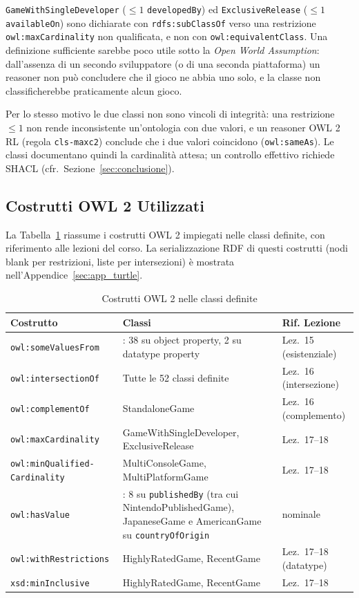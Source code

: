 \texttt{GameWithSingleDeveloper} (${\le}1$ \texttt{developedBy}) ed \texttt{ExclusiveRelease}
(${\le}1$ \texttt{availableOn}) sono dichiarate con \texttt{rdfs:subClassOf} verso una restrizione
\texttt{owl:maxCardinality} non qualificata, e non con \texttt{owl:equivalentClass}. Una definizione
sufficiente sarebbe poco utile sotto la \textit{Open World Assumption}: dall'assenza di un secondo
sviluppatore (o di una seconda piattaforma) un reasoner non pu\`o concludere che il gioco ne abbia uno
solo, e la classe non classificherebbe praticamente alcun gioco.

Per lo stesso motivo le due classi non sono vincoli di integrit\`a: una restrizione ${\le}1$ non rende
inconsistente un'ontologia con due valori, e un reasoner OWL 2 RL (regola \texttt{cls-maxc2}) conclude
che i due valori coincidono (\texttt{owl:sameAs}). Le classi documentano quindi la cardinalit\`a
attesa; un controllo effettivo richiede SHACL (cfr.~Sezione~\ref{sec:conclusione}).

\subsection{Costrutti OWL 2 Utilizzati}

La Tabella~\ref{tab:costrutti} riassume i costrutti OWL 2 impiegati nelle classi
definite, con riferimento alle lezioni del corso. La serializzazione RDF di questi
costrutti (nodi blank per restrizioni, liste per intersezioni) \`e mostrata
nell'Appendice~\ref{sec:app_turtle}.

\begin{table}[h]
\centering
\caption{Costrutti OWL 2 nelle classi definite}
\label{tab:costrutti}
\small
\begin{tabular}{l>{\raggedright\arraybackslash}p{6.2cm}l}
\toprule
\textbf{Costrutto}          & \textbf{Classi}                                & \textbf{Rif. Lezione} \\
\midrule
\texttt{owl:someValuesFrom}& 40: 38 su object property, 2 su datatype property & Lez.~15 (esistenziale) \\
\texttt{owl:intersectionOf}& Tutte le 52 classi definite                      & Lez.~16 (intersezione) \\
\texttt{owl:complementOf}  & StandaloneGame                                   & Lez.~16 (complemento) \\
\texttt{owl:maxCardinality}& GameWithSingleDeveloper, ExclusiveRelease        & Lez.~17--18 \\
\texttt{owl:minQualified-}\newline\texttt{Cardinality}& MultiConsoleGame, MultiPlatformGame                  & Lez.~17--18 \\
\texttt{owl:hasValue}       & 10: 8 su \texttt{publishedBy} (tra cui NintendoPublishedGame), JapaneseGame e AmericanGame su \texttt{countryOfOrigin} & nominale \\
\texttt{owl:withRestrictions} & HighlyRatedGame, RecentGame                   & Lez.~17--18 (datatype) \\
\texttt{xsd:minInclusive}  & HighlyRatedGame, RecentGame                      & Lez.~17--18 \\
\bottomrule
\end{tabular}
\end{table}
